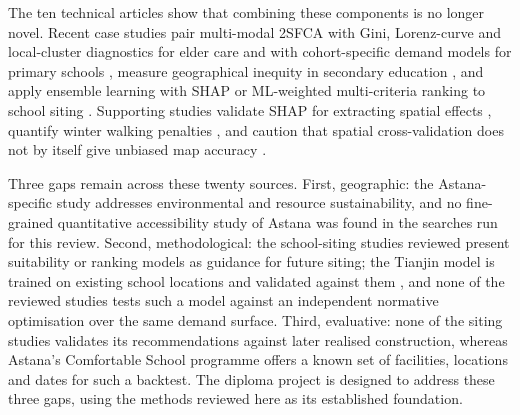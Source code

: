 \documentclass[journal]{IEEEtran}
\begin{document}
The ten technical articles show that combining these components is no longer novel. Recent case studies pair multi-modal 2SFCA with Gini, Lorenz-curve and local-cluster diagnostics for elder care \cite{eldercare2025} and with cohort-specific demand models for primary schools \cite{chengdu2024}, measure geographical inequity in secondary education \cite{italy2022}, and apply ensemble learning with SHAP or ML-weighted multi-criteria ranking to school siting \cite{tianjin2025,schoolsiting2025}. Supporting studies validate SHAP for extracting spatial effects \cite{li2022,li2024}, quantify winter walking penalties \cite{winterwalk2021}, and caution that spatial cross-validation does not by itself give unbiased map accuracy \cite{wadoux2021}.

Three gaps remain across these twenty sources. First, geographic: the Astana-specific study \cite{astana2025} addresses environmental and resource sustainability, and no fine-grained quantitative accessibility study of Astana was found in the searches run for this review. Second, methodological: the school-siting studies reviewed present suitability or ranking models as guidance for future siting; the Tianjin model is trained on existing school locations and validated against them \cite{tianjin2025}, and none of the reviewed studies tests such a model against an independent normative optimisation over the same demand surface. Third, evaluative: none of the siting studies validates its recommendations against later realised construction, whereas Astana's Comfortable School programme offers a known set of facilities, locations and dates for such a backtest. The diploma project is designed to address these three gaps, using the methods reviewed here as its established foundation.



\end{document}

